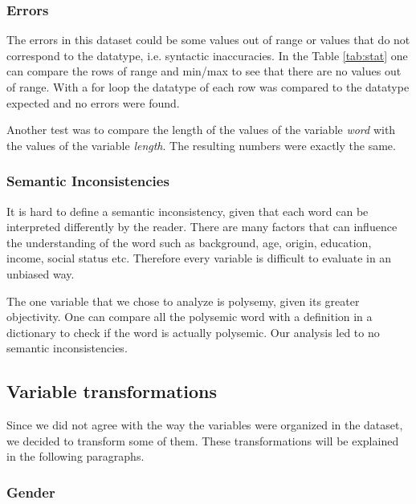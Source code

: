 \documentclass[a4paper,11pt,dvipsnames]{article}
\begin{document}
\subsubsection{Errors}
The errors in this dataset could be some values out of range or values that do not correspond to the datatype, i.e. syntactic inaccuracies. In the Table \ref{tab:stat} one can compare the rows of range and min/max to see that there are no values out of range. With a for loop the datatype of each row was compared to the datatype expected and no errors were found.

Another test was to compare the length of the values of the variable \textit{word} with the values of the variable \textit{length}. The resulting numbers were exactly the same.

\subsubsection{Semantic Inconsistencies}

It is hard to define a semantic inconsistency, given that each word can be interpreted differently by the reader. There are many factors that can influence the understanding of the word such as background, age, origin, education, income, social status etc. Therefore every variable is difficult to evaluate in an unbiased way. 

The one variable that we chose to analyze is polysemy, given its greater objectivity. One can compare all the polysemic word with a definition in a dictionary to check if the word is actually polysemic. Our analysis led to no semantic inconsistencies.

\subsection{Variable transformations}

Since we did not agree with the way the variables were organized in the dataset, we decided to transform some of them. These transformations will be explained in the following paragraphs.

\subsubsection{Gender}
\end{document}
